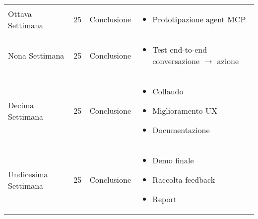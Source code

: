\begin{tabularx}{\textwidth}{@{}l c l X@{}}
Ottava Settimana & 25 & Conclusione & 
    \begin{itemize}
    \item Prototipazione agent MCP
    \end{itemize} \\

Nona Settimana & 25 & Conclusione & 
    \begin{itemize}
    \item Test end-to-end conversazione $\rightarrow$ azione
    \end{itemize} \\

Decima Settimana & 25 & Conclusione & 
    \begin{itemize}
    \item Collaudo
    \item Miglioramento UX
    \item Documentazione
    \end{itemize} \\

Undicesima Settimana & 25 & Conclusione & 
    \begin{itemize}
    \item Demo finale
    \item Raccolta feedback
    \item Report
    \end{itemize} \\

\bottomrule
\end{tabularx}


